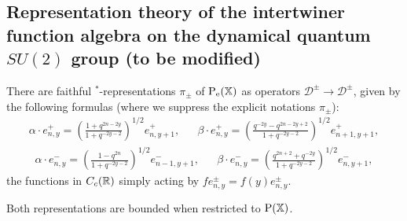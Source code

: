 







\subsection{Representation theory of the intertwiner function algebra on the dynamical quantum $SU(2)$ group (to be modified)}

\begin{Lem} There are faithful $^*$-representations $\pi_{\pm}$ of $\operatorname{\mathrm{P}}_{\operatorname{\mathrm{e}}}(\mathbb{X})$ as operators $\mathscr{D}^{\pm}\rightarrow \mathscr{D}^{\pm}$, given by the following formulas (where we suppress the explicit notations $\pi_{\pm}$): \begin{align*} \alpha\cdot e_{n,y}^+ = \left(\frac{1+q^{2n-2y}}{1+q^{-2y-2}}\right)^{1/2}e_{n,y+1}^+,&& \beta\cdot e_{n,y}^+ = \left(\frac{q^{-2y}-q^{2n-2y+2}}{1+q^{-2y-2}}\right)^{1/2}e_{n+1,y+1}^+,\end{align*}
\begin{align*} \alpha\cdot e_{n,y}^- = \left(\frac{1-q^{2n}}{1+q^{-2y-2}}\right)^{1/2}e_{n-1,y+1}^-,&& \beta\cdot e_{n,y}^- = \left(\frac{q^{2n+2}+q^{-2y}}{1+q^{-2y-2}}\right)^{1/2}e_{n,y+1}^-,\end{align*} the functions in $C_c(\mathbb{R})$ simply acting by $fe_{n,y}^{\pm}= f(y)e_{n,y}^{\pm}$.

Both representations are bounded when restricted to $\operatorname{\mathrm{P}}(\mathbb{X})$.
\end{Lem}

